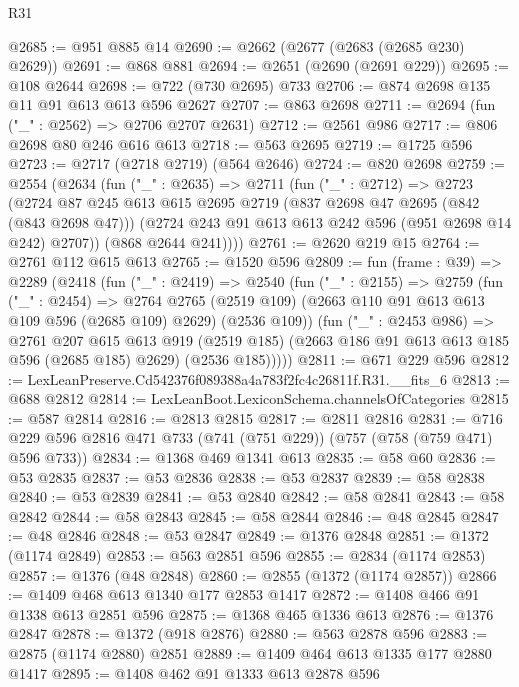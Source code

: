 \begin{lexlean}{R31}
\begin{coremodule}
@2685 := @951 @885 @14
@2690 := @2662 (@2677 (@2683 (@2685 @230) @2629))
@2691 := @868 @881
@2694 := @2651 (@2690 (@2691 @229))
@2695 := @108 @2644
@2698 := @722 (@730 @2695) @733
@2706 := @874 @2698 @135 @11 @91 @613 @613 @596 @2627
@2707 := @863 @2698
@2711 := @2694 (fun ("_" : @2562) => @2706 @2707 @2631)
@2712 := @2561 @986
@2717 := @806 @2698 @80 @246 @616 @613
@2718 := @563 @2695
@2719 := @1725 @596
@2723 := @2717 (@2718 @2719) (@564 @2646)
@2724 := @820 @2698
@2759 := @2554
    (@2634
      (fun ("_" : @2635) =>
      @2711
        (fun ("_" : @2712) =>
        @2723
          (@2724
            @87
            @245
            @613
            @615
            @2695
            @2719
            (@837 @2698 @47 @2695 (@842 (@843 @2698 @47)))
            (@2724 @243 @91 @613 @613 @242 @596 (@951 @2698 @14 @242) @2707))
          (@868 @2644 @241))))
@2761 := @2620 @219 @15
@2764 := @2761 @112 @615 @613
@2765 := @1520 @596
@2809 := fun (frame : @39) =>
  @2289
    (@2418
      (fun ("_" : @2419) =>
      @2540
        (fun ("_" : @2155) =>
        @2759
          (fun ("_" : @2454) =>
          @2764
            @2765
            (@2519 @109)
            (@2663 @110 @91 @613 @613 @109 @596 (@2685 @109) @2629)
            (@2536 @109))
          (fun ("_" : @2453 @986) =>
          @2761
            @207
            @615
            @613
            @919
            (@2519 @185)
            (@2663 @186 @91 @613 @613 @185 @596 (@2685 @185) @2629)
            (@2536 @185)))))
@2811 := @671 @229 @596
@2812 := LexLeanPreserve.Cd542376f089388a4a783f2fc4c26811f.R31.__fits_6
@2813 := @688 @2812
@2814 := LexLeanBoot.LexiconSchema.channelsOfCategories
@2815 := @587 @2814
@2816 := @2813 @2815
@2817 := @2811 @2816
@2831 := @716 @229 @596 @2816 @471 @733 (@741 (@751 @229)) (@757 (@758 (@759 @471) @596 @733))
@2834 := @1368 @469 @1341 @613
@2835 := @58 @60
@2836 := @53 @2835
@2837 := @53 @2836
@2838 := @53 @2837
@2839 := @58 @2838
@2840 := @53 @2839
@2841 := @53 @2840
@2842 := @58 @2841
@2843 := @58 @2842
@2844 := @58 @2843
@2845 := @58 @2844
@2846 := @48 @2845
@2847 := @48 @2846
@2848 := @53 @2847
@2849 := @1376 @2848
@2851 := @1372 (@1174 @2849)
@2853 := @563 @2851 @596
@2855 := @2834 (@1174 @2853)
@2857 := @1376 (@48 @2848)
@2860 := @2855 (@1372 (@1174 @2857))
@2866 := @1409 @468 @613 @1340 @177 @2853 @1417
@2872 := @1408 @466 @91 @1338 @613 @2851 @596
@2875 := @1368 @465 @1336 @613
@2876 := @1376 @2847
@2878 := @1372 (@918 @2876)
@2880 := @563 @2878 @596
@2883 := @2875 (@1174 @2880) @2851
@2889 := @1409 @464 @613 @1335 @177 @2880 @1417
@2895 := @1408 @462 @91 @1333 @613 @2878 @596

\end{coremodule}
\end{lexlean}
